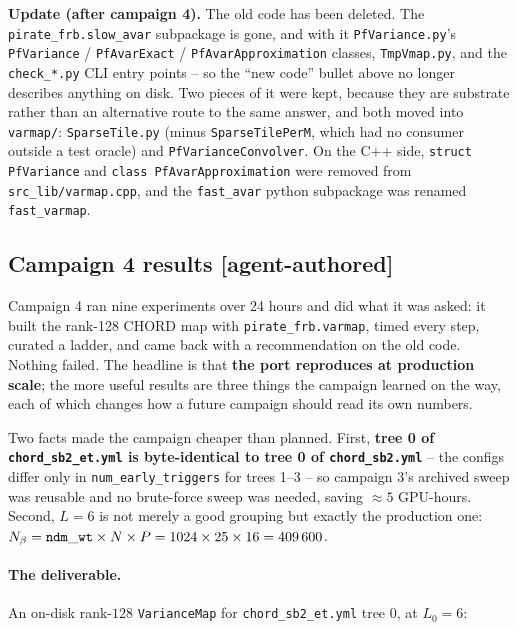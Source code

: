 \documentclass{article}
\numberwithin{equation}{section}   %
\begin{document}
\par\noindent
{\bf Update (after campaign 4).} The old code has been deleted. The
\verb|pirate_frb.slow_avar| subpackage is gone, and with it \verb|PfVariance.py|'s
\verb|PfVariance| / \verb|PfAvarExact| / \verb|PfAvarApproximation| classes,
\verb|TmpVmap.py|, and the \verb|check_*.py| CLI entry points -- so the ``new code'' bullet
above no longer describes anything on disk. Two pieces of it were kept, because they are
substrate rather than an alternative route to the same answer, and both moved into
\verb|varmap/|: \verb|SparseTile.py| (minus \verb|SparseTilePerM|, which had no consumer
outside a test oracle) and \verb|PfVarianceConvolver|. On the C++ side,
{\tt struct PfVariance} and {\tt class PfAvarApproximation} were removed from
\verb|src_lib/varmap.cpp|, and the \verb|fast_avar| python subpackage was renamed
\verb|fast_varmap|.

\subsection{Campaign 4 results [agent-authored]}
\label{ssec:campaign4_results}

Campaign 4 ran nine experiments over 24 hours and did what it was asked: it built the rank-128
CHORD map with {\tt pirate\_frb.varmap}, timed every step, curated a ladder, and came back with
a recommendation on the old code. Nothing failed. The headline is that {\bf the port
reproduces at production scale}; the more useful results are three things the campaign learned
on the way, each of which changes how a future campaign should read its own numbers.

Two facts made the campaign cheaper than planned. First, {\bf tree 0 of {\tt chord\_sb2\_et.yml}
is byte-identical to tree 0 of {\tt chord\_sb2.yml}} -- the configs differ only in
{\tt num\_early\_triggers} for trees 1--3 -- so campaign 3's archived sweep was reusable and no
brute-force sweep was needed, saving $\approx 5$ GPU-hours. Second, $L = 6$ is not merely a good
grouping but exactly the production one: $N_\beta = {\tt ndm\_wt} \times N \times P =
1024 \times 25 \times 16 = 409\,600$.

\paragraph{The deliverable.}
An on-disk rank-$128$ {\tt VarianceMap} for {\tt chord\_sb2\_et.yml} tree 0, at $L_0 = 6$:
\end{document}
